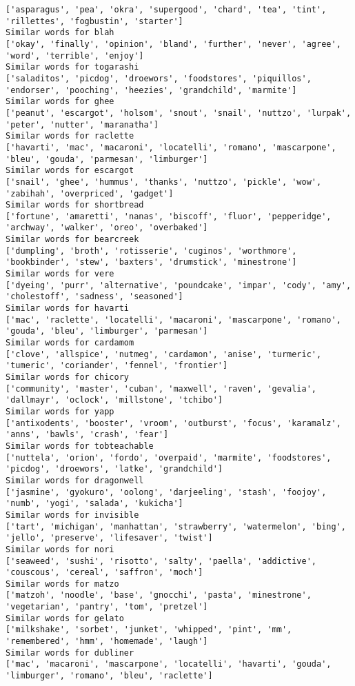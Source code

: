 \documentclass[11pt]{article}
\begin{document}
\begin{Verbatim}[commandchars=\\\{\}]
['asparagus', 'pea', 'okra', 'supergood', 'chard', 'tea', 'tint', 'rillettes', 'fogbustin', 'starter']
Similar words for blah
['okay', 'finally', 'opinion', 'bland', 'further', 'never', 'agree', 'word', 'terrible', 'enjoy']
Similar words for togarashi
['saladitos', 'picdog', 'droewors', 'foodstores', 'piquillos', 'endorser', 'pooching', 'heezies', 'grandchild', 'marmite']
Similar words for ghee
['peanut', 'escargot', 'holsom', 'snout', 'snail', 'nuttzo', 'lurpak', 'peter', 'nutter', 'maranatha']
Similar words for raclette
['havarti', 'mac', 'macaroni', 'locatelli', 'romano', 'mascarpone', 'bleu', 'gouda', 'parmesan', 'limburger']
Similar words for escargot
['snail', 'ghee', 'hummus', 'thanks', 'nuttzo', 'pickle', 'wow', 'zabihah', 'overpriced', 'gadget']
Similar words for shortbread
['fortune', 'amaretti', 'nanas', 'biscoff', 'fluor', 'pepperidge', 'archway', 'walker', 'oreo', 'overbaked']
Similar words for bearcreek
['dumpling', 'broth', 'rotisserie', 'cuginos', 'worthmore', 'bookbinder', 'stew', 'baxters', 'drumstick', 'minestrone']
Similar words for vere
['dyeing', 'purr', 'alternative', 'poundcake', 'impar', 'cody', 'amy', 'cholestoff', 'sadness', 'seasoned']
Similar words for havarti
['mac', 'raclette', 'locatelli', 'macaroni', 'mascarpone', 'romano', 'gouda', 'bleu', 'limburger', 'parmesan']
Similar words for cardamom
['clove', 'allspice', 'nutmeg', 'cardamon', 'anise', 'turmeric', 'tumeric', 'coriander', 'fennel', 'frontier']
Similar words for chicory
['community', 'master', 'cuban', 'maxwell', 'raven', 'gevalia', 'dallmayr', 'oclock', 'millstone', 'tchibo']
Similar words for yapp
['antixodents', 'booster', 'vroom', 'outburst', 'focus', 'karamalz', 'anns', 'bawls', 'crash', 'fear']
Similar words for tobteachable
['nuttela', 'orion', 'fordo', 'overpaid', 'marmite', 'foodstores', 'picdog', 'droewors', 'latke', 'grandchild']
Similar words for dragonwell
['jasmine', 'gyokuro', 'oolong', 'darjeeling', 'stash', 'foojoy', 'numb', 'yogi', 'salada', 'kukicha']
Similar words for invisible
['tart', 'michigan', 'manhattan', 'strawberry', 'watermelon', 'bing', 'jello', 'preserve', 'lifesaver', 'twist']
Similar words for nori
['seaweed', 'sushi', 'risotto', 'salty', 'paella', 'addictive', 'couscous', 'cereal', 'saffron', 'moch']
Similar words for matzo
['matzoh', 'noodle', 'base', 'gnocchi', 'pasta', 'minestrone', 'vegetarian', 'pantry', 'tom', 'pretzel']
Similar words for gelato
['milkshake', 'sorbet', 'junket', 'whipped', 'pint', 'mm', 'remembered', 'hmm', 'homemade', 'laugh']
Similar words for dubliner
['mac', 'macaroni', 'mascarpone', 'locatelli', 'havarti', 'gouda', 'limburger', 'romano', 'bleu', 'raclette']

\end{Verbatim}
\end{document}
